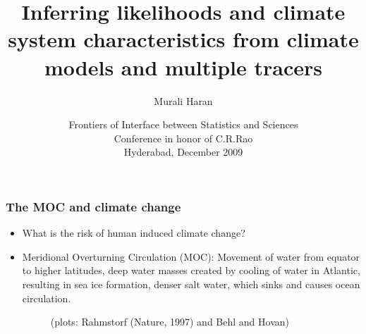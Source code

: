 \documentclass{beamer}
\title[Spatial Models and Computation] %
{Inferring likelihoods and climate system characteristics from climate models and multiple tracers}
\author{Murali Haran}
\institute[Penn State] %
{
  Department of Statistics\\
  Pennsylvania State University\\
\vspace{0.2in}
(joint work with Sham Bhat (Statistics), Roman Tonkonojenkov (Geosciences) and Klaus Keller (Geosciences))
}
\date[SOS 03-2006] %
{Frontiers of Interface between Statistics and Sciences\\ Conference
  in honor of C.R.Rao\\Hyderabad,
  December 2009}
\begin{document}
\begin{frame}
  \titlepage
\end{frame}


\begin{frame}
\frametitle{The MOC and climate change }
 \begin{itemize}
\item What is the risk of human induced climate change?
  \item Meridional Overturning Circulation (MOC): Movement of water from equator to higher
    latitudes, deep water masses created by cooling of water in
    Atlantic, resulting in sea ice formation, denser salt
    water, which sinks and causes ocean circulation.
\begin{figure}
\begin{center} 
\end{center}
{\tiny (plots: Rahmstorf (Nature, 1997) and Behl and Hovan)}
 \end{figure}
 \end{itemize}
\end{frame}
\end{document}

